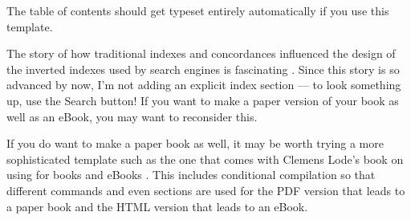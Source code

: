 The table of contents should get typeset entirely automatically if you use this template.

The story of how traditional indexes and concordances influenced the design of the inverted
indexes used by search engines is fascinating \citep[Ch 1]{witten1999gigabytes}.
Since this story is so advanced by now, I'm not adding an explicit index section ---
to look something up, use the Search button! If you want to make a paper
version of your book as well as an eBook, you may want to reconsider this.

If you do want to make a paper book as well, it may be worth trying a
more sophisticated template such as the one that comes with Clemens
Lode's book on using \latex for books and eBooks \citep{lode2019better}.
This includes conditional compilation so that different commands and even sections are used
for the PDF version that leads to a paper book and the HTML version that leads to an eBook.